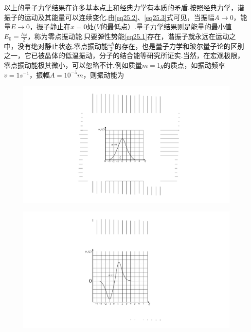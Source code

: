 以上的量子力学结果在许多基本点上和经典力学有本质的矛盾.按照经典力学，谐振子的运动及其能量可以连续变化.由\eqref{eq25.2}、\eqref{eq25.3}式可见，当振幅$A\rightarrow 0$，能量$E\rightarrow 0$，振子静止在$x=0$处($V$的最低点）.量子力学结果则是能量的最小值$E_{0}=\frac{\hbar\omega}{2}$，称为零点振动能.只要弹性势能\eqref{eq25.1}存在，谐振子就永远在运动之中，没有绝对静止状态.零点振动能$\frac{\omega\hbar}{2}$的存在，也是量子力学和玻尔量子论的区别之一，它已被晶体的低温振动，分子的结合能等研究所证实.当然，在宏观极限，零点振动能极其微小，可以忽略不计.例如质量$m=1\si{g}$的质点，如振动频率$v=1\si{s^{-1}}$，振幅$A=10^{-5}\si{m}$，则振动能为
\begin{figure}[!h]
	\centering
	\begin{minipage}[h]{0.49\linewidth}
		\centering
		\includegraphics[width=0.6\linewidth]{QM file/figure/2-7(a)}
		\label{fig.2-7(a)}
	\end{minipage}
	\begin{minipage}[h]{0.49\linewidth}
		\centering
		\includegraphics[width=0.6\linewidth]{QM file/figure/2-7(b)}
		\label{fig.2-7(b)}
	\end{minipage}%
	

\end{figure}
